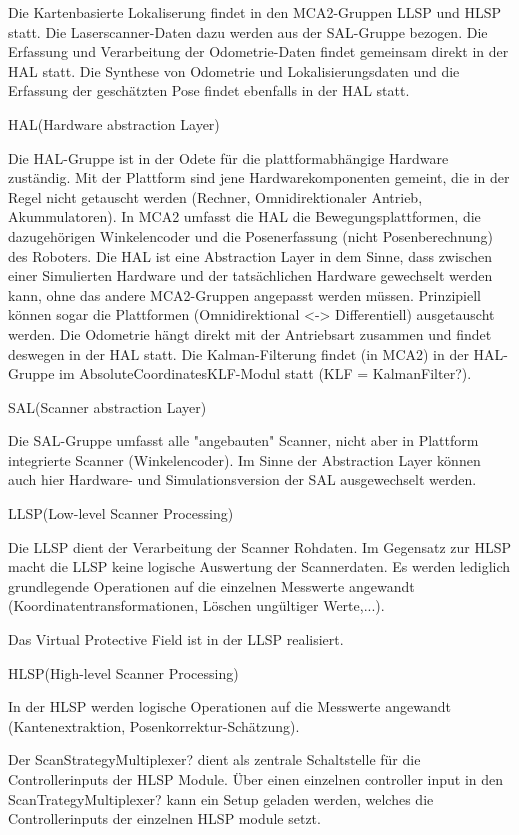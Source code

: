  
Die Kartenbasierte Lokaliserung findet in den MCA2-Gruppen LLSP und HLSP statt.
 Die Laserscanner-Daten dazu werden aus der SAL-Gruppe bezogen. Die Erfassung und Verarbeitung der Odometrie-Daten findet
 gemeinsam direkt in der HAL statt. Die Synthese von Odometrie und Lokalisierungsdaten und die Erfassung der geschätzten
 Pose findet ebenfalls in der HAL statt. 
 
HAL(Hardware abstraction Layer)

Die HAL-Gruppe ist in der Odete für die plattformabhängige Hardware zuständig. Mit der Plattform sind jene
 Hardwarekomponenten gemeint, die in der Regel nicht getauscht werden (Rechner, Omnidirektionaler Antrieb, Akummulatoren).
 In MCA2 umfasst die HAL die Bewegungsplattformen, die dazugehörigen Winkelencoder und die Posenerfassung
 (nicht Posenberechnung) des Roboters. Die HAL ist eine Abstraction Layer in dem Sinne, dass zwischen einer Simulierten
 Hardware und der tatsächlichen Hardware gewechselt werden kann, ohne das andere MCA2-Gruppen angepasst werden müssen.
 Prinzipiell können sogar die Plattformen (Omnidirektional <-> Differentiell) ausgetauscht werden. Die Odometrie hängt
 direkt mit der Antriebsart zusammen und findet deswegen in der HAL statt.
Die Kalman-Filterung findet (in MCA2) in der HAL-Gruppe im
AbsoluteCoordinatesKLF-Modul statt (KLF = KalmanFilter?). 


 SAL(Scanner abstraction Layer)

Die SAL-Gruppe umfasst alle "angebauten" Scanner, nicht aber in Plattform integrierte Scanner (Winkelencoder).
 Im Sinne der Abstraction Layer können auch hier Hardware- und Simulationsversion der SAL ausgewechselt werden.
 
LLSP(Low-level Scanner Processing)

Die LLSP dient der Verarbeitung der Scanner Rohdaten. Im Gegensatz zur HLSP macht die LLSP keine logische Auswertung
 der Scannerdaten. Es werden lediglich grundlegende Operationen auf die einzelnen Messwerte angewandt
 (Koordinatentransformationen, Löschen ungültiger Werte,...).

Das Virtual Protective Field ist in der LLSP realisiert.

HLSP(High-level Scanner Processing)

In der HLSP werden logische Operationen auf die Messwerte angewandt (Kantenextraktion, Posenkorrektur-Schätzung).

Der ScanStrategyMultiplexer? dient als zentrale Schaltstelle für die Controllerinputs der HLSP Module.
 Über einen einzelnen controller input in den ScanTrategyMultiplexer? kann ein Setup geladen werden,
 welches die Controllerinputs der einzelnen HLSP module setzt.  

